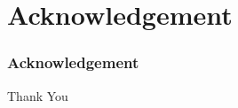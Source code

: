 \documentclass{beamer}
\begin{document}
\section{Acknowledgement}
\begin{frame} [allowframebreaks]
\frametitle{Acknowledgement}
\lipsum[1]


\end{frame}







\begin{frame}
\Huge{\centerline{Thank You}}
\end{frame}

\end{document}
